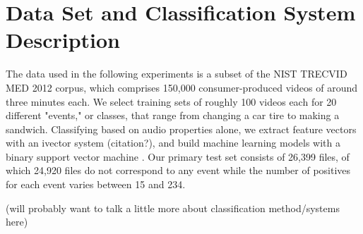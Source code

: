 \section{Data Set and Classification System Description}

The data used in the following experiments is a subset of the NIST TRECVID MED 2012 corpus, which comprises 150,000 consumer-produced videos of around three minutes each. 
We select training sets of roughly 100 videos each for 20 different "events," or classes, that range from changing a car tire to making a sandwich. 
Classifying based on audio properties alone, we extract feature vectors with an ivector system (citation?), and build machine learning models with a binary support vector machine \cite{svm}. 
Our primary test set consists of 26,399 files, of which 24,920 files do not correspond to any event while the number of positives for each event varies between 15 and 234.

(will probably want to talk a little more about classification method/systems here) 

